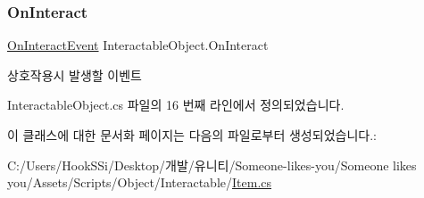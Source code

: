 \subsubsection{\texorpdfstring{OnInteract}{OnInteract}}
{\footnotesize\ttfamily \mbox{\hyperlink{class_interactable_object_a70a579e4b09d53e6cb77b5222189d5eb}{On\+Interact\+Event}} Interactable\+Object.\+On\+Interact\hspace{0.3cm}{\ttfamily [inherited]}}



상호작용시 발생할 이벤트 



Interactable\+Object.\+cs 파일의 16 번째 라인에서 정의되었습니다.



이 클래스에 대한 문서화 페이지는 다음의 파일로부터 생성되었습니다.\+:\begin{DoxyCompactItemize}
\item 
C\+:/\+Users/\+Hook\+S\+Si/\+Desktop/개발/유니티/\+Someone-\/likes-\/you/\+Someone likes you/\+Assets/\+Scripts/\+Object/\+Interactable/\mbox{\hyperlink{_item_8cs}{Item.\+cs}}\end{DoxyCompactItemize}
